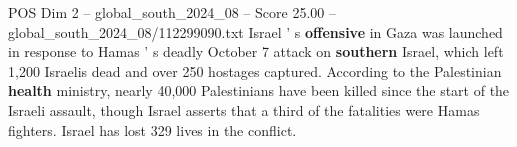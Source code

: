 \begin{textsample}{POS Dim 2 – global\_south\_2024\_08 – Score 25.00 – global\_south\_2024\_08/112299090.txt}
Israel ' s \textbf{offensive} in Gaza was launched in response to Hamas ' s deadly October 7 attack on \textbf{southern} Israel, which left 1,200 Israelis dead and over 250 hostages captured.
According to the Palestinian \textbf{health} ministry, nearly 40,000 Palestinians have been killed since the start of the Israeli assault, though Israel asserts that a third of the fatalities were Hamas fighters.
Israel has lost 329 lives in the conflict.

\end{textsample}
